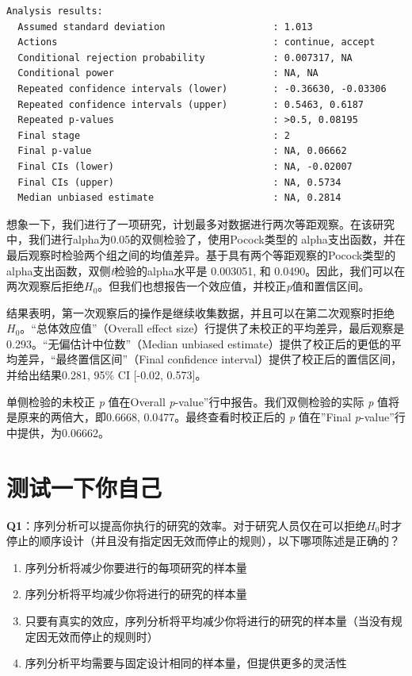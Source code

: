 \documentclass[
  letterpaper,
  DIV=11,
  numbers=noendperiod]{scrreprt}
\providecommand{\tightlist}{%
  \setlength{\itemsep}{0pt}\setlength{\parskip}{0pt}}\usepackage{longtable,booktabs,array}
\begin{document}
\begin{verbatim}
Analysis results:
  Assumed standard deviation                   : 1.013 
  Actions                                      : continue, accept 
  Conditional rejection probability            : 0.007317, NA 
  Conditional power                            : NA, NA 
  Repeated confidence intervals (lower)        : -0.36630, -0.03306 
  Repeated confidence intervals (upper)        : 0.5463, 0.6187 
  Repeated p-values                            : >0.5, 0.08195 
  Final stage                                  : 2 
  Final p-value                                : NA, 0.06662 
  Final CIs (lower)                            : NA, -0.02007 
  Final CIs (upper)                            : NA, 0.5734 
  Median unbiased estimate                     : NA, 0.2814 
\end{verbatim}

想象一下，我们进行了一项研究，计划最多对数据进行两次等距观察。在该研究中，我们进行alpha为0.05的双侧检验了，使用Pocock类型的
alpha支出函数，并在最后观察时检验两个组之间的均值差异。基于具有两个等距观察的Pocock类型的alpha支出函数，双侧\emph{t}检验的alpha水平是
0.003051, 和
0.0490。因此，我们可以在两次观察后拒绝\(H_0\)。但我们也想报告一个效应值，并校正\emph{p}值和置信区间。

结果表明，第一次观察后的操作是继续收集数据，并且可以在第二次观察时拒绝\(H_0\)。``总体效应值''（Overall
effect
size）行提供了未校正的平均差异，最后观察是0.293。``无偏估计中位数''（Median
unbiased estimate）提供了校正后的更低的平均差异，``最终置信区间''（Final
confidence interval）提供了校正后的置信区间，并给出结果0.281, 95\% CI
{[}-0.02, 0.573{]}。

单侧检验的未校正 \emph{p} 值在Overall
\emph{p}-value''行中报告。我们双侧检验的实际 \emph{p}
值将是原来的两倍大，即0.6668, 0.0477。最终查看时校正后的 \emph{p}
值在''Final \emph{p}-value''行中提供，为0.06662。

\hypertarget{ux6d4bux8bd5ux4e00ux4e0bux4f60ux81eaux5df1}{%
\section{测试一下你自己}\label{ux6d4bux8bd5ux4e00ux4e0bux4f60ux81eaux5df1}}

\textbf{Q1}：序列分析可以提高你执行的研究的效率。对于研究人员仅在可以拒绝\(H_0\)时才停止的顺序设计（并且没有指定因无效而停止的规则），以下哪项陈述是正确的？

\begin{enumerate}
\def\labelenumi{\Alph{enumi})}
\tightlist
\item
  序列分析将减少你要进行的每项研究的样本量
\item
  序列分析将平均减少你将进行的研究的样本量
\item
  只要有真实的效应，序列分析将平均减少你将进行的研究的样本量（当没有规定因无效而停止的规则时）
\item
  序列分析平均需要与固定设计相同的样本量，但提供更多的灵活性
\end{enumerate}
\end{document}
